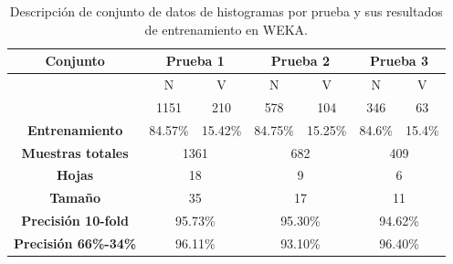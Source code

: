 \documentclass[twoside,spanish,ESP,MSc]{plantillaLabUPV}
\theoremstyle{definition}
\begin{document}
\begin{table}[!tbh]
	\caption{Descripción de conjunto de datos de histogramas por prueba y sus resultados de entrenamiento en WEKA.}
	\label{imadatcol}
	\centering
	\begin{tabular}{|c|c|c|c|c|c|c|}
		\hline
		\textbf{Conjunto}                             & \multicolumn{2}{c|}{\textbf{Prueba 1}}              & \multicolumn{2}{c|}{\textbf{Prueba 2}}              & \multicolumn{2}{c|}{\textbf{Prueba 3}}              \\ \hline
		& {\color[HTML]{F56B00} N} & {\color[HTML]{009901} V} & {\color[HTML]{F56B00} N} & {\color[HTML]{009901} V} & {\color[HTML]{F56B00} N} & {\color[HTML]{009901} V} \\ \cline{2-7} 
		& 1151                     & 210                      & 578                        & 104                        & 346                        & 63                        \\ \cline{2-7} 
		\multirow{-3}{*}{\textbf{Entrenamiento}} & 84.57\%                  & 15.42\%                  & 84.75\%                      & 15.25\%                      & 84.6\%                      & 15.4\%                      \\ \hline
		\textbf{Muestras totales}                & \multicolumn{2}{c|}{1361}                           & \multicolumn{2}{c|}{682}                              & \multicolumn{2}{c|}{409}                              \\ \hline
		\textbf{Hojas}                & \multicolumn{2}{c|}{18}                           & \multicolumn{2}{c|}{9}                              & \multicolumn{2}{c|}{6}                              \\ \hline
		\textbf{Tamaño}                & \multicolumn{2}{c|}{35}                           & \multicolumn{2}{c|}{17}                              & \multicolumn{2}{c|}{11}                              \\ \hline
		\textbf{Precisión 10-fold}               & \multicolumn{2}{c|}{95.73\%}                        & \multicolumn{2}{c|}{95.30\%}                            & \multicolumn{2}{c|}{94.62\%}                            \\ \hline
		\textbf{Precisión 66\%-34\%}             & \multicolumn{2}{c|}{96.11\%}                        & \multicolumn{2}{c|}{93.10\%}                            & \multicolumn{2}{c|}{96.40\%}                            \\ \hline
	\end{tabular}
\end{table}
\end{document}
